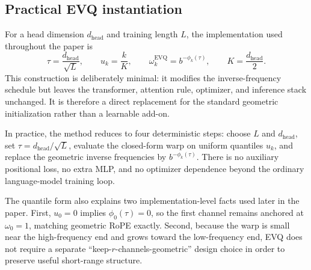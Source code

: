 \subsection{Practical EVQ instantiation}

For a head dimension \(d_{\mathrm{head}}\) and training length \(L\), the implementation used throughout the paper is
\begin{equation}
\tau = \frac{d_{\mathrm{head}}}{\sqrt{L}},
\qquad
u_k = \frac{k}{K},
\qquad
\omega_k^{\mathrm{EVQ}} = b^{-\phi_k(\tau)},
\qquad
K=\frac{d_{\mathrm{head}}}{2}.
\end{equation}
This construction is deliberately minimal: it modifies the inverse-frequency schedule but leaves the transformer, attention rule, optimizer, and inference stack unchanged. It is therefore a direct replacement for the standard geometric initialization rather than a learnable add-on.

In practice, the method reduces to four deterministic steps: choose \(L\) and \(d_{\mathrm{head}}\), set \(\tau=d_{\mathrm{head}}/\sqrt{L}\), evaluate the closed-form warp on uniform quantiles \(u_k\), and replace the geometric inverse frequencies by \(b^{-\phi_k(\tau)}\). There is no auxiliary positional loss, no extra MLP, and no optimizer dependence beyond the ordinary language-model training loop.

The quantile form also explains two implementation-level facts used later in the paper. First, \(u_0=0\) implies \(\phi_0(\tau)=0\), so the first channel remains anchored at \(\omega_0=1\), matching geometric RoPE exactly. Second, because the warp is small near the high-frequency end and grows toward the low-frequency end, EVQ does not require a separate ``keep-\(r\)-channels-geometric'' design choice in order to preserve useful short-range structure.

\begin{center}
\end{center}

